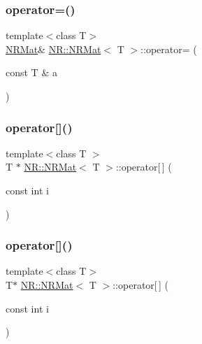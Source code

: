 \mbox{\label{classNR_1_1NRMat_a6a8155b47cfdfb634440ad6600120087}} 
\subsubsection{\texorpdfstring{operator=()}{operator=()}\hspace{0.1cm}{\footnotesize\ttfamily [6/6]}}
{\footnotesize\ttfamily template$<$class T$>$ \\
\mbox{\hyperlink{classNR_1_1NRMat}{N\+R\+Mat}}\& \mbox{\hyperlink{classNR_1_1NRMat}{N\+R\+::\+N\+R\+Mat}}$<$ T $>$\+::operator= (\begin{DoxyParamCaption}\item[{const T \&}]{a }\end{DoxyParamCaption})}

\mbox{\label{classNR_1_1NRMat_aec79531b03f93f4a77b3f4aa534a61a5}} 
\subsubsection{\texorpdfstring{operator[]()}{operator[]()}\hspace{0.1cm}{\footnotesize\ttfamily [1/6]}}
{\footnotesize\ttfamily template$<$class T $>$ \\
T $\ast$ \mbox{\hyperlink{classNR_1_1NRMat}{N\+R\+::\+N\+R\+Mat}}$<$ T $>$\+::operator\mbox{[}$\,$\mbox{]} (\begin{DoxyParamCaption}\item[{const int}]{i }\end{DoxyParamCaption})\hspace{0.3cm}{\ttfamily [inline]}}

\mbox{\label{classNR_1_1NRMat_a387bf9be7d9606ea60e697c31c73df53}} 
\subsubsection{\texorpdfstring{operator[]()}{operator[]()}\hspace{0.1cm}{\footnotesize\ttfamily [2/6]}}
{\footnotesize\ttfamily template$<$class T$>$ \\
T$\ast$ \mbox{\hyperlink{classNR_1_1NRMat}{N\+R\+::\+N\+R\+Mat}}$<$ T $>$\+::operator\mbox{[}$\,$\mbox{]} (\begin{DoxyParamCaption}\item[{const int}]{i }\end{DoxyParamCaption})\hspace{0.3cm}{\ttfamily [inline]}}

